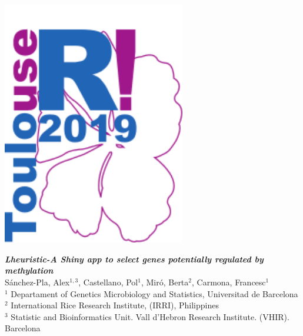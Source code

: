 
\colorbox{qmuldarkblue}{
 \color{white}
 
\begin{minipage}{0.2\textwidth}
\begin{center}
 \vskip 1cm
	
  \includegraphics[width=8cm]{images/useRToulouse.png}

     \end{center}
     
\end{minipage}


\begin{minipage}{0.6\textwidth}
\vspace*{0.4cm}
\begin{center}
   \textrm
   {
    {\huge \bf \em Lheuristic-A Shiny app to select genes potentially regulated by methylation}\\[1ex]
    {\large Sánchez-Pla, Alex$^{1,3}$, Castellano, Pol$^{1}$, Miró, Berta$^2$, Carmona, Francesc$^1$}\\[1ex]
    {\large $^1$ Departament of Genetics Microbiology and Statistics, Universitad de Barcelona\\
    $^2$ International Rice Research Institute, (IRRI), Philippines\\
    $^3$ Statistic and Bioinformatics Unit. Vall d'Hebron Research Institute.  (VHIR). Barcelona}
   }
   \end{center}
   

\end{minipage}}

